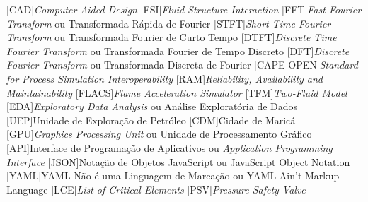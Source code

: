 \begin{acronym}
    [CAD]{\textit{Computer-Aided Design}}
    [FSI]{\textit{Fluid-Structure Interaction}}
    [FFT]{\textit{Fast Fourier Transform} ou Transformada Rápida de Fourier}
    [STFT]{\textit{Short Time Fourier Transform} ou Transformada Fourier de Curto Tempo}
    [DTFT]{\textit{Discrete Time Fourier Transform} ou Transformada Fourier de Tempo Discreto}
    [DFT]{\textit{Discrete Fourier Transform} ou Transformada Discreta de Fourier}
    [CAPE-OPEN]{\textit{Standard for Process Simulation Interoperability}}
    [RAM]{\textit{Reliability, Availability and Maintainability}}
    [FLACS]{\textit{Flame Acceleration Simulator}}
    [TFM]{\textit{Two-Fluid Model}}
    [EDA]{\textit{Exploratory Data Analysis} ou Análise Exploratória de Dados}
    [UEP]{Unidade de Exploração de Petróleo}
    [CDM]{Cidade de Maricá}
    [GPU]{\textit{Graphics Processing Unit} ou Unidade de Processamento Gráfico}
    [API]{Interface de Programação de Aplicativos ou \textit{Application Programming Interface}}
    [JSON]{Notação de Objetos JavaScript ou JavaScript Object Notation}
    [YAML]{YAML Não é uma Linguagem de Marcação ou YAML Ain't Markup Language}
    [LCE]{\textit{List of Critical Elements}}
    [PSV]{\textit{Pressure Safety Valve}}

\end{acronym}
    